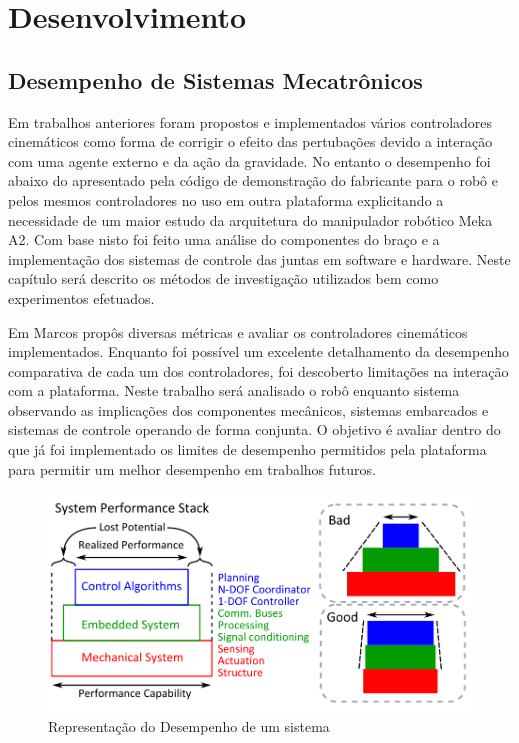 \chapter{Desenvolvimento\label{ch:develop}}


\section{Desempenho de Sistemas Mecatrônicos}

Em trabalhos anteriores foram propostos e implementados vários controladores cinemáticos como forma de corrigir o efeito das pertubações devido a interação com uma agente externo e da ação da gravidade. No entanto o desempenho foi abaixo do apresentado pela código de demonstração do fabricante para o robô e pelos mesmos controladores no uso em outra plataforma explicitando a necessidade de um maior estudo da arquitetura do manipulador robótico Meka A2. Com base nisto foi feito uma análise do componentes do braço e a implementação dos sistemas de controle das juntas em software e hardware. Neste capítulo será descrito os métodos de investigação utilizados bem como experimentos efetuados.

Em \cite{marcosps2016} Marcos propôs diversas métricas e avaliar os controladores cinemáticos implementados. Enquanto foi possível um excelente detalhamento da desempenho comparativa de cada um dos controladores, foi descoberto limitações na interação com a plataforma. Neste trabalho será analisado o robô enquanto sistema observando as implicações dos componentes mecânicos, sistemas embarcados e sistemas de controle operando de forma conjunta. O objetivo é avaliar dentro do que já foi implementado os limites de desempenho permitidos pela plataforma para permitir um melhor desempenho em trabalhos futuros.

\begin{figure}[H]
    \centering
    \includegraphics[width = 0.9\linewidth]{tex/figs/system_perfomance.png}
    \caption{Representação do Desempenho de um sistema \cite{paine2014high}}
    \label{fig:system_perfomance}
\end{figure}


